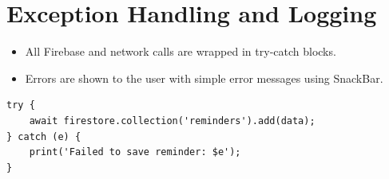 \documentclass[12pt, a4paper, oneside]{report}
\begin{document}
\section{Exception Handling and Logging}
\begin{itemize}
    \item All Firebase and network calls are wrapped in try-catch blocks.
    \item Errors are shown to the user with simple error messages using SnackBar.
\end{itemize}

\begin{lstlisting}
try {
    await firestore.collection('reminders').add(data);
} catch (e) {
    print('Failed to save reminder: $e');
}
\end{lstlisting}
\end{document}
